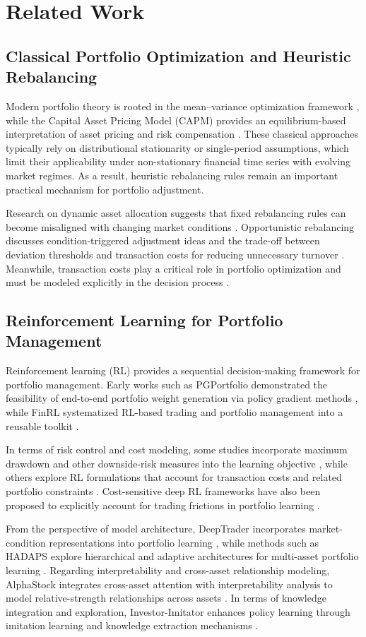 \documentclass[letterpaper]{article} %
\begin{document}
\section{Related Work}
\subsection{Classical Portfolio Optimization and Heuristic Rebalancing}
Modern portfolio theory is rooted in the mean--variance optimization framework \citep{MVO}, while the Capital Asset Pricing Model (CAPM) provides an equilibrium-based interpretation of asset pricing and risk compensation \citep{CAMP}. These classical approaches typically rely on distributional stationarity or single-period assumptions, which limit their applicability under non-stationary financial time series with evolving market regimes. As a result, heuristic rebalancing rules remain an important practical mechanism for portfolio adjustment.

Research on dynamic asset allocation suggests that fixed rebalancing rules can become misaligned with changing market conditions \citep{Perold1988DynamicSF}. Opportunistic rebalancing discusses condition-triggered adjustment ideas and the trade-off between deviation thresholds and transaction costs for reducing unnecessary turnover \citep{9}. Meanwhile, transaction costs play a critical role in portfolio optimization and must be modeled explicitly in the decision process \citep{10}.

\subsection{Reinforcement Learning for Portfolio Management}
Reinforcement learning (RL) provides a sequential decision-making framework for portfolio management. Early works such as PGPortfolio demonstrated the feasibility of end-to-end portfolio weight generation via policy gradient methods \citep{4}, while FinRL systematized RL-based trading and portfolio management into a reusable toolkit \citep{5}.

In terms of risk control and cost modeling, some studies incorporate maximum drawdown and other downside-risk measures into the learning objective \citep{11}, while others explore RL formulations that account for transaction costs and related portfolio constraints \citep{23}. Cost-sensitive deep RL frameworks have also been proposed to explicitly account for trading frictions in portfolio learning \citep{24}.

From the perspective of model architecture, DeepTrader incorporates market-condition representations into portfolio learning \citep{6}, while methods such as HADAPS explore hierarchical and adaptive architectures for multi-asset portfolio learning \citep{25}. Regarding interpretability and cross-asset relationship modeling, AlphaStock integrates cross-asset attention with interpretability analysis to model relative-strength relationships across assets \citep{alphastock}. In terms of knowledge integration and exploration, Investor-Imitator enhances policy learning through imitation learning and knowledge extraction mechanisms \citep{8}.
\end{document}
